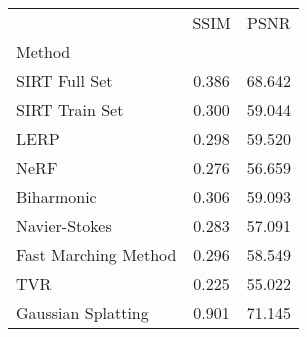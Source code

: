 \begin{tabular}{|l|c|c|}
\toprule
 & SSIM & PSNR \\
Method &  &  \\
\midrule
SIRT Full Set & 0.386 & 68.642 \\
SIRT Train Set & \cellcolor{rankthird}0.300 & 59.044 \\
LERP & 0.298 & \cellcolor{ranksecond}59.520 \\
NeRF & 0.276 & 56.659 \\
Biharmonic & \cellcolor{ranksecond}0.306 & \cellcolor{rankthird}59.093 \\
Navier-Stokes & 0.283 & 57.091 \\
Fast Marching Method & 0.296 & 58.549 \\
TVR & \cellcolor{rankworst}0.225 & \cellcolor{rankworst}55.022 \\
Gaussian Splatting & \cellcolor{rankfirst}0.901 & \cellcolor{rankfirst}71.145 \\
\bottomrule
\end{tabular}
